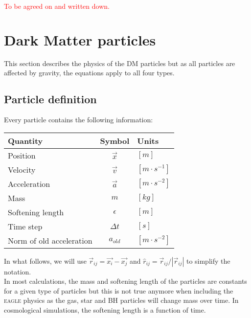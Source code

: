 \documentclass[a4paper,10pt]{report}
\newcommand{\eagle}{\textsc{eagle }}
\begin{document}
\textcolor{red}{To be agreed on and written down.}












\chapter{Dark Matter particles}
\label{chap:DMs}

This section describes the physics of the DM particles but as all particles are affected by gravity, the equations
apply to all four types. 


\section{Particle definition}
Every particle contains the following information:

\begin{table}[h]
\centering
\begin{tabular}{|l|c|l|}
 \hline
 \textbf{Quantity}  & \textbf{Symbol} & \textbf{Units} \\
 \hline \hline
 Position & $\vec{x}$ & $[m]$ \\
 Velocity &$\vec{v}$ & $[m\cdot s^{-1}]$ \\
 Acceleration &$\vec{a}$ & $[m\cdot s^{-2}]$ \\
 Mass & $m$ & $[kg]$ \\
 Softening length & $\epsilon$ & $[m]$ \\
 Time step & $\Delta t$ & $[s]$ \\
 Norm of old acceleration & $a_{old}$ & $[m\cdot s^{-2}]$ \\
\hline
\end{tabular} 
\end{table}


In what follows, we will use $\vec{r}_{ij} = \vec{x_i} - \vec{x_j}$ and $\hat{r}_{ij} = \vec{r}_{ij}/|\vec{r}_{ij}|$
to simplify the notation.\\
In most calculations, the mass and softening length of the particles are constants for a given type of particles but
this is not true anymore when including the \eagle physics as the gas, star and BH particles will change mass over
time. In cosmological simulations, the softening length is a function of time.
\end{document}
